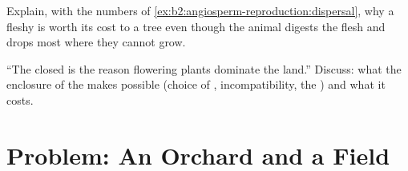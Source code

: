 \begin{exercise}[$\star\star\star$]\label{exo:b2:angiosperm-reproduction:11}
Explain, with the numbers of \cref{ex:b2:angiosperm-reproduction:dispersal},
why a fleshy  is worth its cost to a tree even though the
animal digests the flesh and drops most  where they cannot
grow.
\end{exercise}

\begin{exercise}[$\star\star\star$]\label{exo:b2:angiosperm-reproduction:12}
``The closed  is the reason flowering plants dominate the
land.'' Discuss: what the enclosure of the  makes possible
(choice of , incompatibility, the ) and what it costs.
\end{exercise}

\section{Problem: An Orchard and a Field}

